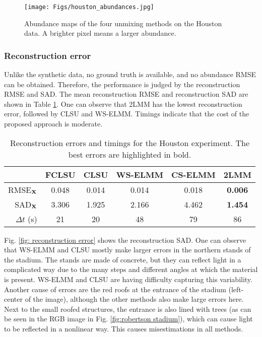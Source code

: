 \begin{figure}[t]
    \centering
    \texttt{[image: Figs/houston\_abundances.jpg]}
    \caption{Abundance maps of the four unmixing methods on the Houston data. A brighter pixel means a larger abundance.}
    \label{fig:abundance maps}
\end{figure}

\subsubsection{Reconstruction error}

Unlike the synthetic data, no ground truth is available, and no abundance RMSE can be obtained. Therefore, the performance is judged by  the reconstruction RMSE and SAD. 
The mean reconstruction RMSE and reconstruction SAD are shown in Table \ref{table: houston}. One can observe that 2LMM  has the lowest reconstruction error, followed by CLSU and WS-ELMM. Timings indicate that the cost of the proposed approach is moderate.

\begin{table}[t]
\caption{Reconstruction errors and timings for the Houston experiment. The best errors are highlighted in bold.}
\centering
\begin{tabular}{r|ccccc|}
\cline{2-6}
\multicolumn{1}{l|}{}           & FCLSU & CLSU  & WS-ELMM & CS-ELMM & 2LMM  \\ \hline \hline
\multicolumn{1}{|r|}{RMSE$_{\mathbf{X}}$} & 0.048 & 0.014 & 0.014   & 0.018   & \textbf{0.006}    \\ \hline
\multicolumn{1}{|r|}{SAD$_{\mathbf{X}}$}  & 3.306 & 1.925 & 2.166   & 4.462   & \textbf{1.454}    \\ \hline
\multicolumn{1}{|r|}{$\Delta t$ (s)}  & 21    & 20    & 48      & 79      & 86                \\ \hline
\end{tabular}
\label{table: houston}
\end{table}

Fig. \ref{fig: reconstruction error} shows the reconstruction SAD. 
One can observe that WS-ELMM and CLSU mostly make larger errors in the northern stands of the stadium. The stands are made of concrete, but they can reflect light in a complicated way due to the many steps and different angles at which the material is present. WS-ELMM and CLSU are having difficulty capturing this variability. Another cause of errors are the red roofs at the entrance of the stadium (left-center of the image), although the other methods also make large errors here. Next to the small roofed structures, the entrance is also lined with trees (as can be seen in the RGB image in Fig. \ref{fig:robertson stadium}), which can cause light to be reflected in a nonlinear way. This causes misestimations in all methods.

